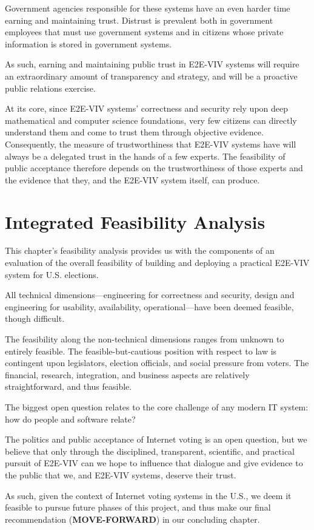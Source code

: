 Government agencies responsible for these systems have an even harder
time earning and maintaining trust.  Distrust is prevalent both in
government employees that must use government systems and in citizens
whose private information is stored in government systems.

As such, earning and maintaining public trust in E2E-VIV systems will
require an extraordinary amount of transparency and strategy, and will
be a proactive public relations exercise.

At its core, since E2E-VIV systems' correctness and security rely upon
deep mathematical and computer science foundations, very few citizens
can directly understand them and come to trust them through objective
evidence. Consequently, the measure of trustworthiness that E2E-VIV
systems have will always be a delegated trust in the hands of a few
experts. The feasibility of public acceptance therefore depends on the
trustworthiness of those experts and the evidence that they, and the
E2E-VIV system itself, can produce.

\section{Integrated Feasibility Analysis}

This chapter's feasibility analysis provides us with the components of
an evaluation of the overall feasibility of building and deploying a
practical E2E-VIV system for U.S. elections.

All technical dimensions---engineering for correctness and security,
design and engineering for usability, availability, operational---have
been deemed feasible, though difficult.

The feasibility along the non-technical dimensions ranges from unknown
to entirely feasible.  The feasible-but-cautious position with respect
to law is contingent upon legislators, election officials, and social
pressure from voters.  The financial, research, integration, and
business aspects are relatively straightforward, and thus feasible.

The biggest open question relates to the core challenge of any modern
IT system: how do people and software relate?

The politics and public acceptance of Internet voting is an open
question, but we believe that only through the disciplined,
transparent, scientific, and practical pursuit of E2E-VIV can we hope
to influence that dialogue and give evidence to the public that we,
and E2E-VIV systems, deserve their trust.

As such, given the context of Internet voting systems in the U.S., we
deem it feasible to pursue future phases of this project, and thus
make our final recommendation (\textbf{MOVE-FORWARD}) in our
concluding chapter.

